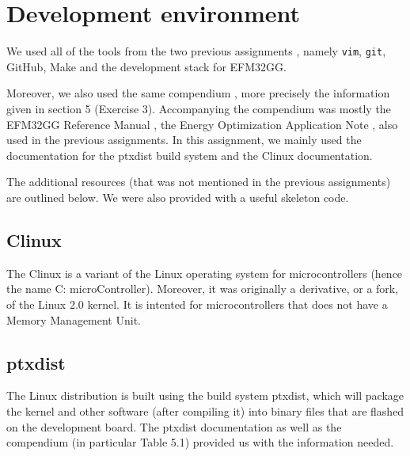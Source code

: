 \section{Development environment}
We used all of the tools from the two previous assignments \cite{report-1}, namely \texttt{vim}, \texttt{git}, GitHub, Make and the development stack for EFM32GG.

Moreover, we also used the same compendium \cite{eeds-compendium}, more precisely the information given in section 5 (Exercise 3).
Accompanying the compendium was mostly the EFM32GG Reference Manual \cite{efm32gg-ref-man}, the Energy Optimization Application Note \cite{efm32gg-energy-op}, also used in the previous assignments. In this assignment, we mainly used the documentation for the ptxdist build system and the \si{\micro}Clinux documentation.

The additional resources (that was not mentioned in the previous assignments) are outlined below. We were also provided with a useful skeleton code.

\subsection{\si{\micro}Clinux}
The \si{\micro}Clinux is a variant of the Linux operating system for microcontrollers (hence the name \si{\micro}C: microController). Moreover, it was originally a derivative, or a fork, of the Linux 2.0 kernel.
It is intented for microcontrollers that does not have a Memory Management Unit.

\subsection{ptxdist}
The Linux distribution is built using the build system ptxdist, which will package the kernel and other software (after compiling it) into binary files that are flashed on the development board.
The ptxdist documentation as well as the compendium (in particular Table 5.1) provided us with the information needed.

